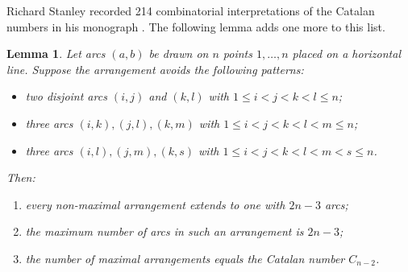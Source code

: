 \documentclass[12pt,a4paper]{amsart}
\newtheorem{Lemma}[Theorem]{Lemma}
\theoremstyle{definition}
\begin{document}
Richard Stanley recorded 214 combinatorial interpretations of the Catalan numbers in his monograph \cite{Stanley15}. The following lemma adds one more to this list.
\begin{Lemma}\label{lem: arcs_with_forbidden_patterns}
Let arcs $(a,b)$ be drawn on $n$ points $1,\dots,n$ placed on a horizontal line. Suppose the arrangement avoids the following patterns:
\begin{itemize}
  \item two disjoint arcs $(i,j)$ and $(k,l)$ with $1 \le i<j<k<l \le n$;
  \item three arcs $(i,k),(j,l),(k,m)$ with $1 \le i<j<k<l<m \le n$;
  \item three arcs $(i,l),(j,m),(k,s)$ with $1 \le i<j<k<l<m<s \le n$.
\end{itemize}
Then:
\begin{enumerate}
  \item every non-maximal arrangement extends to one with $2n-3$ arcs;
    \item the maximum number of arcs in such an arrangement is $2n-3$;
  \item the number of maximal arrangements equals the Catalan number $C_{n-2}$.
\end{enumerate}
\end{Lemma}
\end{document}
